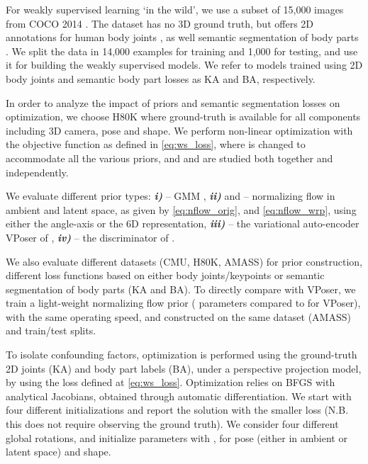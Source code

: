 \documentclass[runningheads]{llncs}
\begin{document}
For weakly supervised learning `in the wild', we use a subset of 15,000 images from COCO 2014 \cite{MsCOCO}. 
The dataset has no 3D ground truth, but offers 2D annotations for human body joints , as well semantic segmentation of body parts .  We split the data in 14,000 examples for training and 1,000 for testing, and use it for building the weakly supervised models. We refer to models trained using 2D body joints and semantic body part losses as KA and BA, respectively.

 In order to analyze the impact of priors and semantic segmentation losses on optimization, we choose H80K where ground-truth is available for all components including 3D camera, pose and shape. We perform non-linear optimization with the objective function as defined in \eqref{eq:ws_loss}, where  is changed to accommodate all the various priors, and  and  are studied both together and independently.

We evaluate different prior types: \textit{\bf i)}  -- GMM \cite{bogo2016}, \textit{\bf ii)}  and  -- normalizing flow in ambient and latent space, as given by \eqref{eq:nflow_orig}, and \eqref{eq:nflow_wrp}, using either the angle-axis or the 6D representation, \textit{\bf iii)}   -- the variational auto-encoder VPoser of \cite{pavlakoscvpr2019}, \textit{\bf iv)}  -- the discriminator of \cite{Kanazawa2018}. 
 
We also evaluate different datasets (CMU, H80K, AMASS) for prior construction, different loss functions based on either body joints/keypoints or semantic segmentation of body parts (KA and BA). To directly compare with VPoser, we train a light-weight normalizing flow prior ( parameters compared to  for VPoser), with the same operating speed, and constructed on the same dataset (AMASS) and train/test splits. 

To isolate confounding factors, optimization is performed using the ground-truth 2D joints (KA) and body part labels (BA), under a perspective projection model, by using the loss defined at \eqref{eq:ws_loss}. Optimization relies on BFGS with analytical Jacobians, obtained through automatic differentiation. We start with four different initializations and report the solution with the smaller loss (N.B. this does not require observing the ground truth). We consider four different global rotations, and initialize parameters with , for pose (either in ambient or latent space) and shape.
\end{document}
